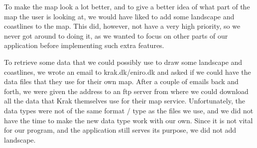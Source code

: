 To make the map look a lot better, and to give a better idea of what part of the map the user is looking at, we would have liked to add some landscape and coastlines to the map. This did, however, not have a very high priority, so we never got around to doing it, as we wanted to focus on other parts of our application before implementing such extra features.

To retrieve some data that we could possibly use to draw some landscape and coastlines, we wrote an email to krak.dk/eniro.dk and asked if we could have the data files that they use for their own map. After a couple of emails back and forth, we were given the address to an ftp server from where we could download all the data that Krak themselves use for their map service. Unfortunately, the data types were not of the same format / type as the files we use, and we did not have the time to make the new data type work with our own. Since it is not vital for our program, and the application still serves its purpose, we did not add landscape.